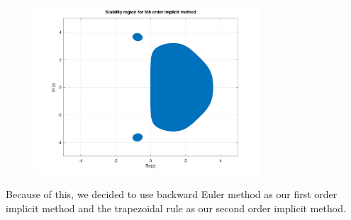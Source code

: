 \begin{figure}[H]
	\centering
	\includegraphics[width=0.75\textwidth]{sixth_order_stab_region.png}
\end{figure}
Because of this, we decided to use backward Euler method as our first order implicit method and the trapezoidal rule as our second order implicit method. 

